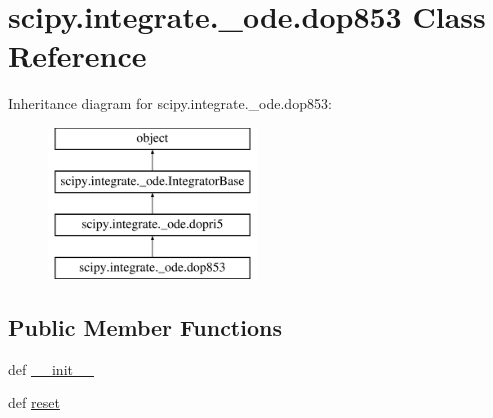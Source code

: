 \hypertarget{classscipy_1_1integrate_1_1__ode_1_1dop853}{}\section{scipy.\+integrate.\+\_\+ode.\+dop853 Class Reference}
\label{classscipy_1_1integrate_1_1__ode_1_1dop853}
Inheritance diagram for scipy.\+integrate.\+\_\+ode.\+dop853\+:\begin{figure}[H]
\begin{center}
\leavevmode
\includegraphics[height=4.000000cm]{classscipy_1_1integrate_1_1__ode_1_1dop853}
\end{center}
\end{figure}
\subsection*{Public Member Functions}
\begin{DoxyCompactItemize}
\item 
def \hyperlink{classscipy_1_1integrate_1_1__ode_1_1dop853_a0f0d32560444972f3bc69c6260e6328e}{\+\_\+\+\_\+init\+\_\+\+\_\+}
\item 
def \hyperlink{classscipy_1_1integrate_1_1__ode_1_1dop853_a1028d9db00199853e3084ad5cc611337}{reset}
\end{DoxyCompactItemize}
